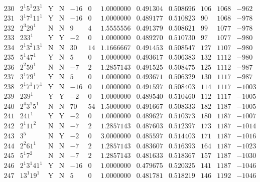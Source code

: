 \documentclass[11pt,reqno,a4letter]{article}
\numberwithin{figure}{section}
\numberwithin{table}{section}
\theoremstyle{plain}
\numberwithin{theorem}{section}
\theoremstyle{definition}
\begin{document}
\begin{table}[h!]
\begin{equation*}
{\begin{array}{cc|cc|ccc|cc|ccc}
 230 & 2^1 5^1 23^1 & \text{Y} & \text{N} & -16 & 0 & 1.0000000 & 0.491304 & 0.508696 & 106 & 1068 & -962 \\
 231 & 3^1 7^1 11^1 & \text{Y} & \text{N} & -16 & 0 & 1.0000000 & 0.489177 & 0.510823 & 90 & 1068 & -978 \\
 232 & 2^3 29^1 & \text{N} & \text{N} & 9 & 4 & 1.5555556 & 0.491379 & 0.508621 & 99 & 1077 & -978 \\
 233 & 233^1 & \text{Y} & \text{Y} & -2 & 0 & 1.0000000 & 0.489270 & 0.510730 & 97 & 1077 & -980 \\
 234 & 2^1 3^2 13^1 & \text{N} & \text{N} & 30 & 14 & 1.1666667 & 0.491453 & 0.508547 & 127 & 1107 & -980 \\
 235 & 5^1 47^1 & \text{Y} & \text{N} & 5 & 0 & 1.0000000 & 0.493617 & 0.506383 & 132 & 1112 & -980 \\
 236 & 2^2 59^1 & \text{N} & \text{N} & -7 & 2 & 1.2857143 & 0.491525 & 0.508475 & 125 & 1112 & -987 \\
 237 & 3^1 79^1 & \text{Y} & \text{N} & 5 & 0 & 1.0000000 & 0.493671 & 0.506329 & 130 & 1117 & -987 \\
 238 & 2^1 7^1 17^1 & \text{Y} & \text{N} & -16 & 0 & 1.0000000 & 0.491597 & 0.508403 & 114 & 1117 & -1003 \\
 239 & 239^1 & \text{Y} & \text{Y} & -2 & 0 & 1.0000000 & 0.489540 & 0.510460 & 112 & 1117 & -1005 \\
 240 & 2^4 3^1 5^1 & \text{N} & \text{N} & 70 & 54 & 1.5000000 & 0.491667 & 0.508333 & 182 & 1187 & -1005 \\
 241 & 241^1 & \text{Y} & \text{Y} & -2 & 0 & 1.0000000 & 0.489627 & 0.510373 & 180 & 1187 & -1007 \\
 242 & 2^1 11^2 & \text{N} & \text{N} & -7 & 2 & 1.2857143 & 0.487603 & 0.512397 & 173 & 1187 & -1014 \\
 243 & 3^5 & \text{N} & \text{Y} & -2 & 0 & 3.0000000 & 0.485597 & 0.514403 & 171 & 1187 & -1016 \\
 244 & 2^2 61^1 & \text{N} & \text{N} & -7 & 2 & 1.2857143 & 0.483607 & 0.516393 & 164 & 1187 & -1023 \\
 245 & 5^1 7^2 & \text{N} & \text{N} & -7 & 2 & 1.2857143 & 0.481633 & 0.518367 & 157 & 1187 & -1030 \\
 246 & 2^1 3^1 41^1 & \text{Y} & \text{N} & -16 & 0 & 1.0000000 & 0.479675 & 0.520325 & 141 & 1187 & -1046 \\
 247 & 13^1 19^1 & \text{Y} & \text{N} & 5 & 0 & 1.0000000 & 0.481781 & 0.518219 & 146 & 1192 & -1046 \\

\end{array}}
\end{equation*}
\end{table}
\end{document}
